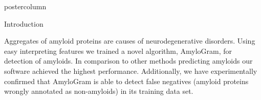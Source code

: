 \documentclass[final]{beamer}\usepackage[]{graphicx}\usepackage[]{color}
\newlength{\columnheight}
\begin{document}
\begin{frame}
\begin{columns}
\begin{column}{.53\textwidth}
\begin{beamercolorbox}[center,wd=\textwidth]{postercolumn}
\begin{minipage}[T]{.95\textwidth}
\parbox[t][\columnheight]{\textwidth}
{
\begin{block}{Introduction}


Aggregates of amyloid proteins are causes of neurodegenerative disorders. Using easy interpreting features we trained a novel algorithm, AmyloGram, for detection of amyloids. In comparison to other methods predicting amyloids our software achieved the highest performance. Additionally, we have experimentally confirmed that AmyloGram is able to detect false negatives (amyloid proteins wrongly annotated as non-amyloids) in its training data set.

    \end{block}

}
\end{minipage}
\end{beamercolorbox}
\end{column}
\end{columns}
\end{frame}
\end{document}
